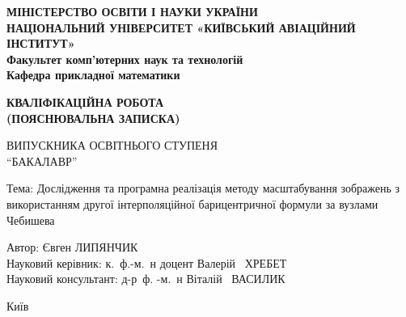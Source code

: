 
\begin{titlepage}
	\centering
	
	{
		\large 
		\MakeUppercase{\textbf{міністерство освіти і науки україни}}\\
		\MakeUppercase{\textbf{Національний університет «київський авіаційний інститут»}}\\
		\textbf{Факультет комп'ютерних наук та технологій\\
		Кафедра прикладної математики}
	}
	\vspace{5mm}
	
	\vspace{8mm}
	
	{
		\Huge\bfseries \MakeUppercase{кваліфікаційна робота} \\
		\large (\MakeUppercase{пояснювальна записка})\\
	}
	\vspace{2cm}

	\MakeUppercase{випускника освітнього ступеня} \\
	\enquote{\MakeUppercase{бакалавр}}
	
	\begin{center}
		Тема: Дослідження та програмна реалізація методу масштабування зображень з використанням другої інтерполяційної барицентричної формули за вузлами Чебишева
	\end{center}
	\vfill
	
	{
		Автор: \hfill Євген ЛИПЯНЧИК\\
		Науковий керівник: \hfill к.~ф.-м.~н доцент Валерій ~ХРЕБЕТ\\
		Науковий консультант: \hfill д-р~ф. -м.~н
		Віталій ~ВАСИЛИК\\
	}
	\vfill
	
	Київ \the\year
	
	\thispagestyle{empty}
\end{titlepage}